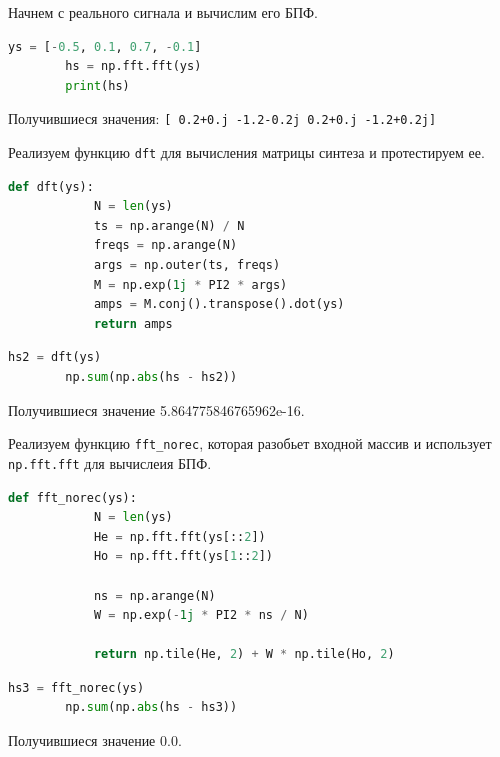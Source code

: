 \documentclass[a4paper, 14pt]{extarticle}
\begin{document}
    Начнем с реального сигнала и вычислим его БПФ.

    \begin{lstlisting}[language=Python, caption= Получение БПФ, label={lst:get_bpf}]
        ys = [-0.5, 0.1, 0.7, -0.1]
        hs = np.fft.fft(ys)
        print(hs)
    \end{lstlisting}

    Получившиеся значения: \texttt{[ 0.2+0.j -1.2-0.2j 0.2+0.j -1.2+0.2j]}

    Реализуем функцию \texttt{dft} для вычисления матрицы синтеза и протестируем ее.

    \begin{lstlisting}[language=Python, caption= Функция dft, label={lst:dft}]
        def dft(ys):
            N = len(ys)
            ts = np.arange(N) / N
            freqs = np.arange(N)
            args = np.outer(ts, freqs)
            M = np.exp(1j * PI2 * args)
            amps = M.conj().transpose().dot(ys)
            return amps
    \end{lstlisting}

    \begin{lstlisting}[language=Python, caption= Использование dft, label={lst:call_dft}]
        hs2 = dft(ys)
        np.sum(np.abs(hs - hs2))
    \end{lstlisting}

    Получившиеся значение 5.864775846765962e-16.

    Реализуем функцию \texttt{fft\_norec}, которая разобьет входной массив и использует \texttt{np.fft.fft} для вычислеия БПФ.

    \begin{lstlisting}[language=Python, caption= Функция fft\_norec, label={lst:fft_norec}]
        def fft_norec(ys):
            N = len(ys)
            He = np.fft.fft(ys[::2])
            Ho = np.fft.fft(ys[1::2])

            ns = np.arange(N)
            W = np.exp(-1j * PI2 * ns / N)

            return np.tile(He, 2) + W * np.tile(Ho, 2)
    \end{lstlisting}

    \begin{lstlisting}[language=Python, caption= Использование fft\_norec, label={lst:call_fft_norec}]
        hs3 = fft_norec(ys)
        np.sum(np.abs(hs - hs3))
    \end{lstlisting}

    Получившиеся значение 0.0.
\end{document}
